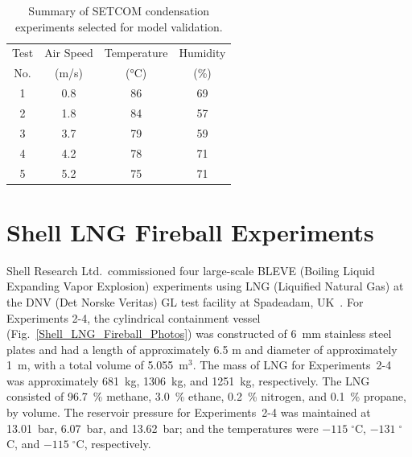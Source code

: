 \begin{table}[h]
   \centering
   \caption[Summary of SETCOM condensation experiments selected for model validation]{Summary of SETCOM condensation experiments selected for model validation.}
      \begin{tabular}{|c|c|c|c|}
         \hline
         Test      &  Air Speed        &  Temperature          &  Humidity             \\
         No.       &  (m/s)            &  (\unit{\degreeCelsius})        &  (\%)                 \\ \hline \hline
         1         &  0.8              &  86                   &  69                   \\ \hline
         2         &  1.8              &  84                   &  57                   \\ \hline
         3         &  3.7              &  79                   &  59                   \\ \hline
         4         &  4.2              &  78                   &  71                   \\ \hline
         5         &  5.2              &  75                   &  71                   \\ \hline
      \end{tabular}
   \label{SETCOM_condensation_Summary}
\end{table}

\FloatBarrier


\section{Shell LNG Fireball Experiments}
\label{Shell_LNG_Fireballs_Description}

Shell Research Ltd.~commissioned four large-scale BLEVE (Boiling Liquid Expanding Vapor Explosion) experiments using LNG (Liquified Natural Gas) at the DNV (Det Norske Veritas) GL test facility at Spadeadam, UK~\cite{Betteridge:2015}. For Experiments 2-4, the cylindrical containment vessel (Fig.~\ref{Shell_LNG_Fireball_Photos}) was constructed of 6~mm stainless steel plates and had a length of approximately 6.5 m and diameter of approximately 1~m, with a total volume of 5.055~m$^3$. The mass of LNG for Experiments~2-4 was approximately 681~kg, 1306~kg, and 1251~kg, respectively. The LNG consisted of 96.7~\% methane, 3.0~\% ethane, 0.2~\% nitrogen, and 0.1~\% propane, by volume. The reservoir pressure for Experiments~2-4 was maintained at 13.01~bar, 6.07~bar, and 13.62~bar; and the temperatures were $-115 \; ^\circ$C, $-131 \; ^\circ$C, and $-115 \; ^\circ$C, respectively.

